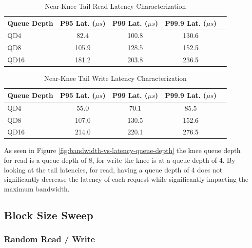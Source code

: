 \documentclass[11pt]{article}
\begin{document}
\begin{table}[H]
	\centering
	\caption{Near-Knee Tail Read Latency Characterization}
	\label{tab:near-knee-read}
	\begin{tabular}{@{}lcccc@{}}
		\toprule
		Queue Depth & P95 Lat. ($\mu s$) & P99 Lat. ($\mu s$) & P99.9 Lat. ($\mu s$) \\
		\midrule
		QD4         & 82.4               & 100.8              & 130.6                \\
		QD8         & 105.9              & 128.5              & 152.5                \\
		QD16        & 181.2              & 203.8              & 236.5                \\
		\bottomrule
	\end{tabular}
\end{table}

\begin{table}[H]
	\centering
	\caption{Near-Knee Tail Write Latency Characterization}
	\label{tab:near-knee-write}
	\begin{tabular}{@{}lcccc@{}}
		\toprule
		Queue Depth & P95 Lat. ($\mu s$) & P99 Lat. ($\mu s$) & P99.9 Lat. ($\mu s$) \\
		\midrule
		QD4         & 55.0               & 70.1               & 85.5                 \\
		QD8         & 107.0              & 130.5              & 152.6                \\
		QD16        & 214.0              & 220.1              & 276.5                \\
		\bottomrule
	\end{tabular}
\end{table}

As seen in Figure \ref{fig:bandwidth-vs-latency-queue-depth} the knee queue depth for read is a queue depth of 8, for
write the knee is at a queue depth of 4. By looking at the tail latencies, for read, having a queue depth of 4 does not
significantly decrease the latency of each request while significantly impacting the maximum bandwidth.

\subsection{Block Size Sweep}
\subsubsection{Random Read / Write}
\end{document}
